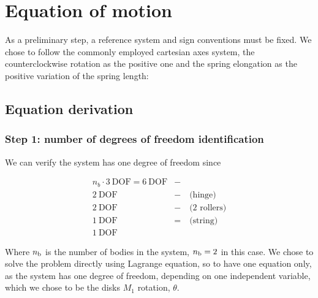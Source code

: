 \documentclass[a4paper,12pt,oneside]{article}
\begin{document}
\clearpage

\section{Equation of motion}

As a preliminary step, a reference system and sign conventions must be fixed. We chose to follow the commonly employed cartesian axes system, the counterclockwise rotation as the positive one and the spring elongation as the positive variation of the spring length:

\begin{figure}
	\centering
	\hspace{50pt}
\end{figure}

\subsection{Equation derivation}

\subsubsection*{Step 1: number of degrees of freedom identification}

We can verify the system has one degree of freedom since

\[ \begin{split}
	n_b \cdot 3 ~ \text{DOF} = 6 ~ \text{DOF} & - \\
	2 ~ \text{DOF} & - \quad \text{(hinge)} \\
	2 ~ \text{DOF}  & - \quad \text{(2 rollers)} \\
	1 ~ \text{DOF} & = \quad \text{(string)} \\
	1 ~ \text{DOF}
\end{split} \]

Where $ n_\textup{b} $ is the number of bodies in the system, $ n_\textup{b} = 2 $ in this case. We chose to solve the problem directly using Lagrange equation, so to have one equation only, as the system has one degree of freedom, depending on one independent variable, which we chose to be the disks $ M_1 $ rotation, $ \theta $.
\end{document}
